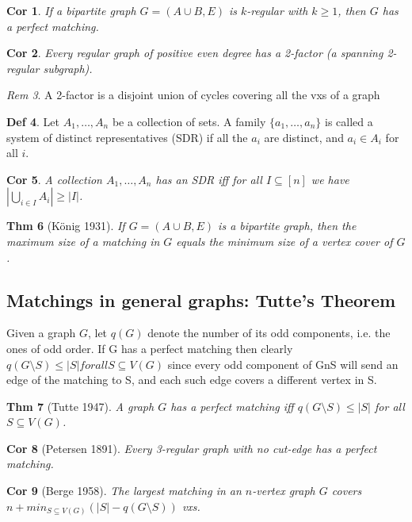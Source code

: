 \documentclass[11pt, fleqn, a4paper, landscape]{article}
\theoremstyle{plain} %
\newtheorem{thm}{Thm}
\newtheorem{cor}[thm]{Cor}
\theoremstyle{remark} %
\newtheorem{rem}[thm]{Rem}
\theoremstyle{definition} %
\newtheorem{defi}[thm]{Def}
\begin{document}
\begin{multicols}{5}
\begin{cor}
If a bipartite graph $G = (A \cup B,E) $ is $k$-regular with $k \ge 1$, then $G$ has a perfect matching.
\end{cor}

\begin{cor}
Every regular graph of positive even degree has a 2-factor (a spanning 2-regular subgraph).
\end{cor}

\begin{rem}
A 2-factor is a disjoint union of cycles covering all the vxs of a graph
\end{rem}

\begin{defi}
Let $A_1, \dots ,A_n$ be a collection of sets. A family $\{a_1, \dots , a_n\}$  is called a system of distinct representatives (SDR) if all the $a_i$ are distinct, and $a_i \in A_i$ for all $i$.
\end{defi}

\begin{cor}
A collection $A_1, \dots ,A_n$ has an SDR iff for all $I \subseteq [n]$ we have $|\bigcup_{i\in I} A_i|\ge|I|$.
\end{cor}
\addtocounter{thm}{1}
\begin{thm}[König 1931]
If $G = (A \cup B,E)$ is a bipartite graph, then the maximum size of a
matching in $G$ equals the minimum size of a vertex cover of $G$.
\end{thm}

\subsection{Matchings in general graphs: Tutte’s Theorem}
Given a graph $G$, let $q(G)$ denote the number of its odd components, i.e. the ones of odd order. If G has a perfect matching then clearly
$q(G\setminus S) \le|S|for all S \subseteq V (G)$
since every odd component of GnS will send an edge of the matching to S, and each such edge covers a different vertex in S.

\begin{thm}[Tutte 1947]
A graph $G$ has a perfect matching iff $q(G\setminus S) \le|S|$ for
all $S \subseteq V (G)$.
\end{thm}

\begin{cor}[Petersen 1891]
Every 3-regular graph with no cut-edge has a perfect matching.
\end{cor}
\addtocounter{thm}{1}
\begin{cor}[Berge 1958]
The largest matching in an $n$-vertex graph $G$ covers $n+min_{S\subseteq V (G)}(|S|- q(G\setminus S))$ vxs.
\end{cor}


\end{multicols}
\end{document}
